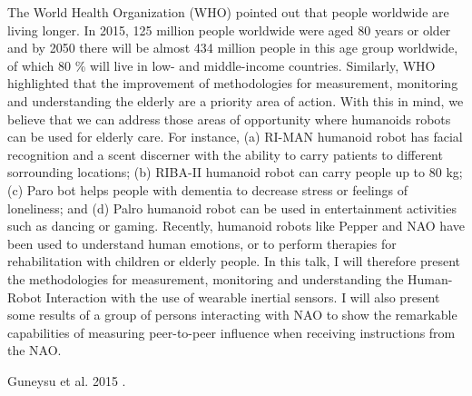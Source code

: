 \documentclass[a4paper]{article}
\begin{document}
The World Health Organization (WHO) pointed out that people worldwide are living longer.
In 2015, 125 million people worldwide were aged 80 years or older
and by 2050 there will be almost 434 million people in this age group worldwide,
 of which 80 \% will live in low- and middle-income countries.
Similarly, WHO highlighted that the improvement of methodologies for measurement,
monitoring and understanding the elderly are a priority area of action.
With this in mind, we believe that we can address those areas of opportunity
where humanoids robots can be used for elderly care.
For instance, (a) RI-MAN humanoid robot
has facial recognition and a scent discerner with the ability to
carry patients to different sorrounding locations;
(b) RIBA-II humanoid robot can carry people up to 80 kg;
(c) Paro bot helps people with dementia to decrease stress or feelings of loneliness; and
(d) Palro humanoid robot can be used in entertainment activities such as dancing or gaming.
Recently, humanoid robots like Pepper and NAO have been used to understand
human emotions, or to perform therapies for rehabilitation with children or
elderly people.
In this talk, I will therefore present the  methodologies for measurement,
monitoring and understanding the Human-Robot Interaction with the use of wearable
inertial sensors.
I will also present some results of a group of persons interacting with NAO
to show the remarkable capabilities of measuring peer-to-peer influence when
receiving instructions from the NAO.


Guneysu et al. 2015 \cite{guneysu2015children}.




\end{document}
